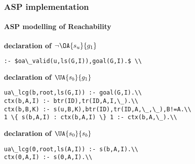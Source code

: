 \begin{frame}
\frametitle{ASP implementation}
 \framesubtitle{ASP modelling of Reachability}

\textbf{\iI declaration of $\neg \OA{s_u}{g_1}$} \\
\vspace{0.1in}
\begin{lstlisting}
:- $oa\_valid(u,ls(G,I)),goal(G,I).$ \\
\end{lstlisting}
\vspace{0.1in}


\textbf{\iII declaration of $\UA{s_b}{g_1}$}\\
\vspace{0.1in}
\begin{lstlisting}
ua\_lcg(b,root,ls(G,I)) :- goal(G,I).\\
ctx(b,A,I) :- btr(ID),tr(ID,A,I,\_).\\
ctx(b,B,K) :- s(u,B,K),btr(ID),tr(ID,A,\_,\_),B!=A.\\
1 \{ s(b,A,I) : ctx(b,A,I) \} 1 :- ctx(b,A,\_).\\
\end{lstlisting}
\vspace{0.1in}

\textbf{\iIIIb declaration of $\UA{s_0}{s_b}$}\\
\vspace{0.1in}
\begin{lstlisting}
ua\_lcg(0,root,ls(A,I)) :- s(b,A,I).\\
ctx(0,A,I) :- s(0,A,I).\\
\end{lstlisting}
\vspace{0.1in}
\end{frame}



\begin{comment}
Therefore, our characterization is sound (no false positive) but incomplete: some $t_b$
might be missed (false negatives).
Using \iIIIa instead of \iIIIb potentially reduces the false negatives, at the condition that the
prefix of the unfolding is tractable. When facing a model too large for the unfolding approach, we
should rely on \iIIIb which is much more scalable but may lead to more false
negatives.

Relying on the unfolding from $s_b$ ($\unf(s_b)$) is not considered here, as it would require to
compute a prefix from each $s_b$ candidate, whereas $\unf(s_0)$ is computed only once before the
bifurcation identification.
\end{comment}
